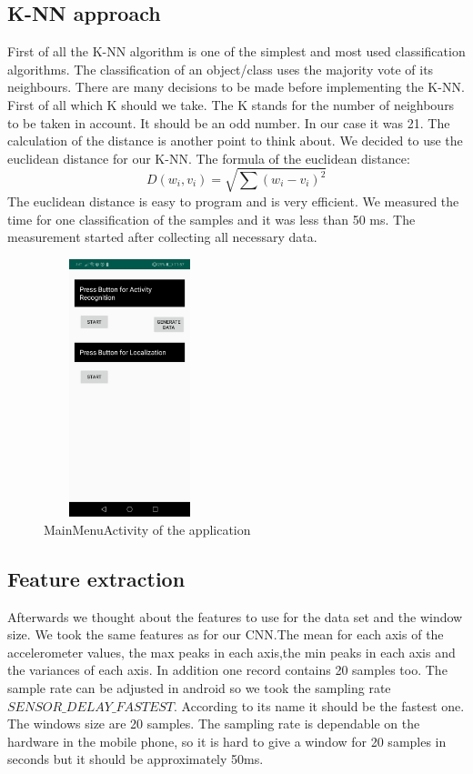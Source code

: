 \documentclass[conference]{IEEEtran}
\begin{document}
\subsection{K-NN approach}
First of all the K-NN algorithm is one of the simplest and most used classification algorithms. The classification of an object/class uses the majority vote of its neighbours. There are many decisions to be made before implementing the K-NN. First of all which K should we take. The K stands for the number of neighbours to be taken in account. It should be an odd number. In our case it was 21. The calculation of the distance is another point to think about. We decided to use the euclidean distance for our K-NN. The formula of the euclidean distance:
\begin{equation}
D(w_i,v_i) = \sqrt{\sum{(w_i - v_i)^2}}
\end{equation}
The euclidean distance is easy to program and is very efficient. We measured the time for one classification of the samples and it was less than 50 ms. The measurement started after collecting all necessary data.
\begin{figure}
\includegraphics[height = 7.5cm,width = 5cm]{Images/MainActivity.jpeg}
\centering
\caption{MainMenuActivity of the application}
\label{fig:mainmenuactivity}
\end{figure}
\subsection{Feature extraction}
Afterwards we thought about the features to use for the data set and the window size. We took the same features as for our CNN.The mean for each axis of the accelerometer values, the max peaks in each axis,the min peaks in each axis and the variances of each axis. 
In addition one record contains 20 samples too. The sample rate can be adjusted in android so we took the sampling rate $SENSOR\_DELAY\_FASTEST$. According to its name it should be the fastest one. The windows size are 20 samples. The sampling rate is dependable on the hardware in the mobile phone, so it is hard to give a window for 20 samples in seconds but it should be approximately 50ms. 
\end{document}
